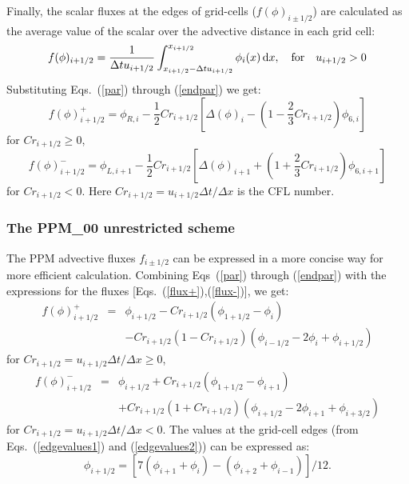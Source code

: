   Finally, the scalar fluxes at the edges of grid-cells
  ($f(\phi)_{i\pm1/2}$) are calculated as the average value of the scalar
  over the advective distance in each grid cell:  
  \begin{equation}
    f(\phi)_{i+1/2} = \frac{1}{\Delta t u_{i+1/2}}
    \int_{x_{i+1/2}-\Delta tu_{i+1/2}}^{x_{i+1/2}} \phi_{i}(x) \,\mathrm{d} x,
    \quad \mathrm{for} \quad u_{i+1/2} > 0
  \end{equation}
  Substituting Eqs.~(\ref{par}) through (\ref{endpar}) we get:
  \begin{equation}
    \label{flux+}
    f(\phi)_{i+1/2}^{+} = \phi_{R,i} -
     \frac{1}{2} Cr_{i+1/2} \left[\Delta(\phi)_{i} - 
     \left(1- \frac{2}{3} Cr_{i+1/2} \right) \phi_{6,i} \right]
  \end{equation}
  for $Cr_{i+1/2} \geq 0$,
  \begin{equation}
    \label{flux-}
    f(\phi)_{i+1/2}^{-} = \phi_{L,i+1} -
     \frac{1}{2} Cr_{i+1/2} \left[ \Delta(\phi)_{i+1} + 
     \left(1 + \frac{2}{3} Cr_{i+1/2} \right) \phi_{6,i+1} \right]
  \end{equation}
  for $Cr_{i+1/2} < 0$. Here $Cr_{i+1/2} = u_{i+1/2}\Delta t/\Delta x$
  is the CFL number. 

  \subsubsection{The PPM\_00 unrestricted scheme}

  The PPM advective fluxes $f_{i\pm1/2}$ can be expressed in a more
  concise way for more efficient calculation. Combining Eqs~(\ref{par})
  through (\ref{endpar}) with the expressions for the fluxes
  [Eqs.~(\ref{flux+}),(\ref{flux-})], we get:
  \begin{eqnarray}
    \label{sflux+}
    f(\phi)_{i+1/2}^{+} &=& \phi_{i+1/2} - Cr_{i+1/2}(\phi_{1+1/2} -
    \phi_{i}) \\ \nonumber
    & & - Cr_{i+1/2}(1-Cr_{i+1/2})(\phi_{i-1/2} - 2\phi_{i} +
    \phi_{i+1/2})    
  \end{eqnarray}
  for $Cr_{i+1/2} = u_{i+1/2}\Delta t/\Delta x \geq 0$,
  \begin{eqnarray}
    \label{sflux-}
    f(\phi)_{i+1/2}^{-} &=& \phi_{i+1/2} + Cr_{i+1/2}(\phi_{1+1/2} -
    \phi_{i+1}) \\ \nonumber
    & & + Cr_{i+1/2}(1+Cr_{i+1/2})(\phi_{i+1/2} - 2\phi_{i+1} +
     \phi_{i+3/2}) 
  \end{eqnarray}
  for $Cr_{i+1/2} = u_{i+1/2}\Delta t/\Delta x < 0$. The values at the
  grid-cell edges (from Eqs.~(\ref{edgevalues1}) and
  (\ref{edgevalues2})) can be expressed as:
  \begin{equation}
    \label{sedgevalues}
    \phi_{i+1/2} = \left [7(\phi_{i+1} + \phi_{i}) - (\phi_{i+2} +
     \phi_{i-1}) \right ]/12.
  \end{equation}
    
